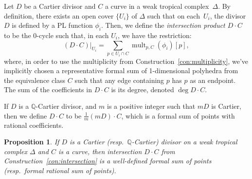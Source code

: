 \documentclass[11pt,reqno]{amsart}
\newtheorem{prop}[thm]{Proposition}
\theoremstyle{definition}
\newcommand{\defi}[1]{\emph{#1}}
\newcommand{\mult}{\operatorname{mult}}
\newcommand{\QQ}{\mathbb Q}
\begin{document}
\begin{const}\label{con:intersection}
Let $D$ be a Cartier divisor and $C$ a curve in a weak tropical
complex~$\Delta$. By definition,
there exists an open cover $\{U_i\}$ of $\Delta$ such that
on each~$U_i$, the divisor $D$ is defined by a PL function $\phi_i$. Then, we
define the \defi{intersection product $D \cdot C$} to be the 0-cycle such that,
in each $U_i$, we have the restriction:
\begin{equation}\label{eq:intersection-const}
(D \cdot C)\vert_{U_i} = \sum_{p \in U_i \cap C} \mult_{p,C}(\phi_i) [p],
\end{equation}
where, in order to use the multiplicity from
Construction~\ref{con:multiplicity}, we've implicitly chosen a representative
formal sum of 1-dimensional polyhedra from the equivalence class $C$ such that
any edge containing $p$ has $p$ as an endpoint.
The sum of the coefficients in $D \cdot C$ is its degree, denoted
$\deg D \cdot C$.

If $D$ is a $\QQ$-Cartier divisor, and $m$ is a positive integer such that $mD$
is Cartier, then we define $D \cdot C$ to be $\frac{1}{m} (mD) \cdot C$, which
is a formal sum of points with rational coefficients.
\end{const}

\begin{prop}\label{p:intersection}
If $D$ is a Cartier (resp.\ $\QQ$-Cartier) divisor on a weak tropical complex
$\Delta$ and $C$ is a curve, then
intersection $D \cdot C$ from Construction~\ref{con:intersection} is a
well-defined formal sum of points (resp.\ formal rational sum of points).
\end{prop}
\end{document}
